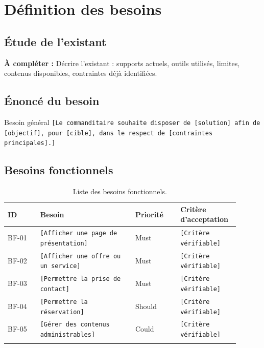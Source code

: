 \documentclass[11pt,a4paper]{report}
\newcommand{\placeholder}[1]{\textcolor{placeholderColor}{\texttt{[#1]}}}
\newcommand{\todo}[1]{\textcolor{todoColor}{\textbf{À compléter :} #1}}
\newcommand{\blankspace}[1]{\vspace*{#1}}
\begin{document}
\chapter{Définition des besoins}

\section{Étude de l'existant}
\todo{Décrire l'existant : supports actuels, outils utilisés, limites, contenus disponibles, contraintes déjà identifiées.}
\blankspace{8cm}

\section{Énoncé du besoin}
\begin{requirementbox}{Besoin général}
\placeholder{Le commanditaire souhaite disposer de [solution] afin de [objectif], pour [cible], dans le respect de [contraintes principales].}
\end{requirementbox}
\blankspace{5cm}

\section{Besoins fonctionnels}
\begin{longtable}{p{0.13\linewidth}p{0.38\linewidth}p{0.18\linewidth}p{0.21\linewidth}}
\toprule
\textbf{ID} & \textbf{Besoin} & \textbf{Priorité} & \textbf{Critère d'acceptation} \\
\midrule
\endhead
BF-01 & \placeholder{Afficher une page de présentation} & Must & \placeholder{Critère vérifiable} \\
BF-02 & \placeholder{Afficher une offre ou un service} & Must & \placeholder{Critère vérifiable} \\
BF-03 & \placeholder{Permettre la prise de contact} & Must & \placeholder{Critère vérifiable} \\
BF-04 & \placeholder{Permettre la réservation} & Should & \placeholder{Critère vérifiable} \\
BF-05 & \placeholder{Gérer des contenus administrables} & Could & \placeholder{Critère vérifiable} \\
\bottomrule
\caption{Liste des besoins fonctionnels.}
\label{tab:besoins-fonctionnels}
\end{longtable}
\end{document}
